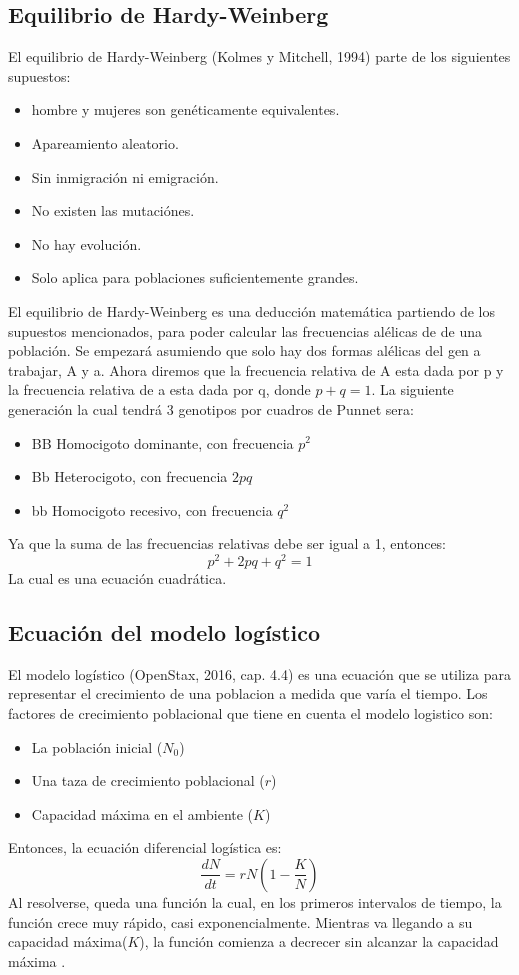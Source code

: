\documentclass[12pt]{article}
\begin{document}
\subsection*{Equilibrio de Hardy-Weinberg}
El equilibrio de Hardy-Weinberg  (Kolmes y Mitchell, 1994) parte de los siguientes supuestos:
\begin{itemize}
    \item hombre y mujeres son genéticamente equivalentes.
    \item Apareamiento aleatorio.
    \item Sin inmigración ni emigración.
    \item No existen las mutaciónes.
    \item No hay evolución.
    \item Solo aplica para poblaciones suficientemente grandes.
\end{itemize}
El equilibrio de Hardy-Weinberg es una deducción matemática partiendo de los supuestos mencionados, para poder calcular las frecuencias alélicas de de una población.
Se empezará asumiendo que solo hay dos formas alélicas del gen a trabajar, A y a. Ahora diremos que la frecuencia relativa de A esta dada por p y la frecuencia relativa de a esta dada por q, donde \(p+q=1\). La siguiente generación la cual tendrá 3 genotipos por cuadros de Punnet sera:
\begin{itemize}
    \item BB Homocigoto dominante, con frecuencia \(p^2\)
    \item Bb Heterocigoto, con frecuencia \(2pq\)
    \item bb Homocigoto recesivo, con frecuencia \(q^2\)
\end{itemize}
Ya que la suma de las frecuencias relativas debe ser igual a 1, entonces:
\[
p^2+2pq+q^2=1
\]
La cual es una ecuación cuadrática.
\subsection*{Ecuación del modelo logístico}
El modelo logístico (OpenStax, 2016, cap. 4.4) es una ecuación que se utiliza para representar el crecimiento de una poblacion a medida que varía el tiempo. Los factores de crecimiento poblacional que tiene en cuenta el modelo logistico son:
\begin{itemize}
    \item La población inicial (\(N_0\))
    \item Una taza de crecimiento poblacional (\(r\))
    \item Capacidad máxima en el ambiente (\(K\))
\end{itemize}
Entonces, la ecuación diferencial logística es:
\[
\frac{dN}{dt} = rN \left(1-\frac{K}{N}\right)
\]
Al resolverse, queda una función la cual, en los primeros intervalos de tiempo, la función crece muy rápido, casi exponencialmente. Mientras va llegando a su capacidad máxima(\(K\)), la función comienza a decrecer sin alcanzar la capacidad máxima . 
\end{document}
